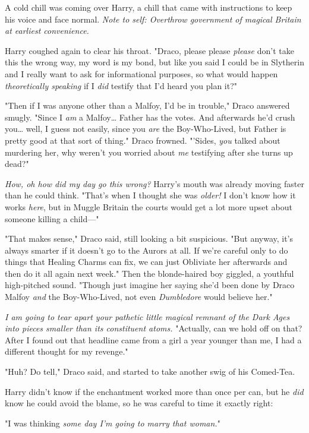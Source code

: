 A cold chill was coming over Harry, a chill that came with instructions to keep
his voice and face normal. \emph{Note to self: Overthrow government of magical
Britain at earliest convenience.}

Harry coughed again to clear his throat. "Draco, please please \emph{please}
don't take this the wrong way, my word is my bond, but like you said I could be
in Slytherin and I really want to ask for informational purposes, so what would
happen \emph{theoretically speaking} if I \emph{did} testify that I'd heard you
plan it?"

"Then if I was anyone other than a Malfoy, I'd be in trouble," Draco answered
smugly. "Since I \emph{am} a Malfoy{\ldots} Father has the votes. And
afterwards he'd crush you{\ldots} well, I guess not easily, since you
\emph{are} the Boy-Who-Lived, but Father is pretty good at that sort of thing."
Draco frowned. "'Sides, \emph{you} talked about murdering her, why weren't you
worried about \emph{me} testifying after she turns up dead?"

\emph{How, oh how did my day go this wrong?} Harry's mouth was already moving
faster than he could think. "That's when I thought she was \emph{older!} I
don't know how it works \emph{here}, but in Muggle Britain the courts would get
a lot more upset about someone killing a child---"

"That makes sense," Draco said, still looking a bit suspicious. "But anyway,
it's always smarter if it doesn't go to the Aurors at all. If we're careful
only to do things that Healing Charms can fix, we can just Obliviate her
afterwards and then do it all again next week." Then the blonde-haired boy
giggled, a youthful high-pitched sound. "Though just imagine her saying she'd
been done by Draco Malfoy \emph{and} the Boy-Who-Lived, not even
\emph{Dumbledore} would believe her."

\emph{I am going to tear apart your pathetic little magical remnant of the Dark
Ages into pieces smaller than its constituent atoms.} "Actually, can we hold
off on that? After I found out that headline came from a girl a year younger
than me, I had a different thought for my revenge."

"Huh? Do tell," Draco said, and started to take another swig of his Comed-Tea.

Harry didn't know if the enchantment worked more than once per can, but he
\emph{did} know he could avoid the blame, so he was careful to time it exactly
right:

"I was thinking \emph{some day I'm going to marry that woman.}"

